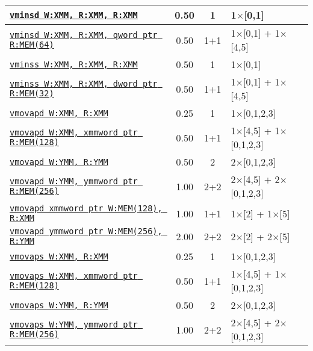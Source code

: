 \documentclass[a4paper,english,fontsize=9]{scrartcl}
\begin{document}
\begin{longtable}{p{}ccL{.25\textwidth}}
  \midrule
  \texttt{\href{https://felixcloutier.com/x86/MINSD.html}{vminsd W:XMM, R:XMM, R:XMM}} & 0.50 & 1 & 1\(\times\)[0,1] \\
  \midrule
  \texttt{\href{https://felixcloutier.com/x86/MINSD.html}{vminsd W:XMM, R:XMM, qword ptr R:MEM(64)}} & 0.50 & 1+1 & 1\(\times\)[0,1] + 1\(\times\)[4,5] \\
  \midrule
  \texttt{\href{https://felixcloutier.com/x86/MINSS.html}{vminss W:XMM, R:XMM, R:XMM}} & 0.50 & 1 & 1\(\times\)[0,1] \\
  \midrule
  \texttt{\href{https://felixcloutier.com/x86/MINSS.html}{vminss W:XMM, R:XMM, dword ptr R:MEM(32)}} & 0.50 & 1+1 & 1\(\times\)[0,1] + 1\(\times\)[4,5] \\
  \midrule
  \texttt{\href{https://felixcloutier.com/x86/MOVAPD.html}{vmovapd W:XMM, R:XMM}} & 0.25 & 1 & 1\(\times\)[0,1,2,3] \\
  \midrule
  \texttt{\href{https://felixcloutier.com/x86/MOVAPD.html}{vmovapd W:XMM, xmmword ptr R:MEM(128)}} & 0.50 & 1+1 & 1\(\times\)[4,5] + 1\(\times\)[0,1,2,3] \\
  \midrule
  \texttt{\href{https://felixcloutier.com/x86/MOVAPD.html}{vmovapd W:YMM, R:YMM}} & 0.50 & 2 & 2\(\times\)[0,1,2,3] \\
  \midrule
  \texttt{\href{https://felixcloutier.com/x86/MOVAPD.html}{vmovapd W:YMM, ymmword ptr R:MEM(256)}} & 1.00 & 2+2 & 2\(\times\)[4,5] + 2\(\times\)[0,1,2,3] \\
  \midrule
  \texttt{\href{https://felixcloutier.com/x86/MOVAPD.html}{vmovapd xmmword ptr W:MEM(128), R:XMM}} & 1.00 & 1+1 & 1\(\times\)[2] + 1\(\times\)[5] \\
  \midrule
  \texttt{\href{https://felixcloutier.com/x86/MOVAPD.html}{vmovapd ymmword ptr W:MEM(256), R:YMM}} & 2.00 & 2+2 & 2\(\times\)[2] + 2\(\times\)[5] \\
  \midrule
  \texttt{\href{https://felixcloutier.com/x86/MOVAPS.html}{vmovaps W:XMM, R:XMM}} & 0.25 & 1 & 1\(\times\)[0,1,2,3] \\
  \midrule
  \texttt{\href{https://felixcloutier.com/x86/MOVAPS.html}{vmovaps W:XMM, xmmword ptr R:MEM(128)}} & 0.50 & 1+1 & 1\(\times\)[4,5] + 1\(\times\)[0,1,2,3] \\
  \midrule
  \texttt{\href{https://felixcloutier.com/x86/MOVAPS.html}{vmovaps W:YMM, R:YMM}} & 0.50 & 2 & 2\(\times\)[0,1,2,3] \\
  \midrule
  \texttt{\href{https://felixcloutier.com/x86/MOVAPS.html}{vmovaps W:YMM, ymmword ptr R:MEM(256)}} & 1.00 & 2+2 & 2\(\times\)[4,5] + 2\(\times\)[0,1,2,3] \\

\end{longtable}
\end{document}
